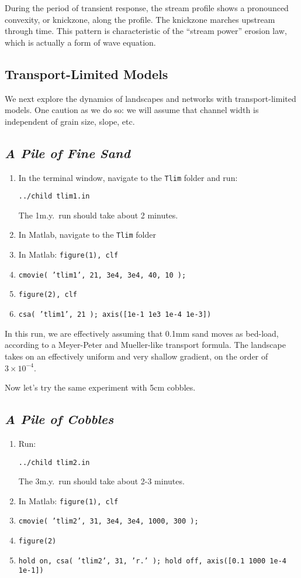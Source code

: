\documentclass[12pt]{amsart}
\begin{document}
\noindent
During the period of transient response, the stream profile shows a pronounced convexity, or knickzone, along the profile. The knickzone marches upstream through time. This pattern is characteristic of the ``stream power'' erosion law, which is actually a form of wave equation.

\subsection{Transport-Limited Models}

We next explore the dynamics of landscapes and networks with transport-limited models. One caution as we do so: we will assume that channel width is independent of grain size, slope, etc.

\subsection*{\em A Pile of Fine Sand}

{ \em
\begin{enumerate}
\item
In the terminal window, navigate to the {\tt Tlim} folder and run:

{\tt ../child tlim1.in}

The 1m.y.\ run should take about 2 minutes.
\item
In Matlab, navigate to the {\tt Tlim} folder
\item
In Matlab: {\tt figure(1), clf}
\item
{\tt cmovie( 'tlim1', 21, 3e4, 3e4, 40, 10 );}
\item
{\tt figure(2), clf}
\item
{\tt csa( 'tlim1', 21 ); axis([1e-1 1e3 1e-4 1e-3])}
\end{enumerate}
}

\noindent
In this run, we are effectively assuming that 0.1mm sand moves as bed-load, according to a Meyer-Peter and Mueller-like transport formula. The landscape takes on an effectively uniform and very shallow gradient, on the order of $3\times 10^{-4}$.

Now let's try the same experiment with 5cm cobbles.

\subsection*{\em A Pile of Cobbles}

{ \em
\begin{enumerate}
\item
Run:

{\tt ../child tlim2.in}

The 3m.y.\ run should take about 2-3 minutes.
\item
In Matlab: {\tt figure(1), clf}
\item
{\tt cmovie( 'tlim2', 31, 3e4, 3e4, 1000, 300 );}
\item
{\tt figure(2)}
\item
{\tt hold on, csa( 'tlim2', 31, 'r.' ); hold off, axis([0.1 1000 1e-4 1e-1])}
\end{enumerate}
}
\end{document}
